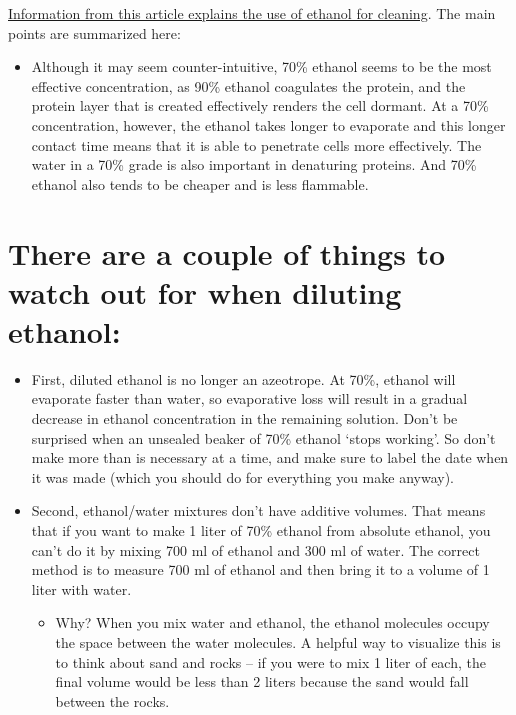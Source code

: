 \documentclass[
  letterpaper,
  DIV=11,
  numbers=noendperiod]{scrreprt}
\providecommand{\tightlist}{%
  \setlength{\itemsep}{0pt}\setlength{\parskip}{0pt}}\usepackage{longtable,booktabs,array}
\begin{document}
\href{https://bitesizebio.com/13518/which-type-of-ethanol-should-i-use/}{Information
from this article explains the use of ethanol for cleaning}. The main
points are summarized here:

\begin{itemize}
\tightlist
\item
  Although it may seem counter-intuitive, 70\% ethanol seems to be the
  most effective concentration, as 90\% ethanol coagulates the protein,
  and the protein layer that is created effectively renders the cell
  dormant. At a 70\% concentration, however, the ethanol takes longer to
  evaporate and this longer contact time means that it is able to
  penetrate cells more effectively. The water in a 70\% grade is also
  important in denaturing proteins. And 70\% ethanol also tends to be
  cheaper and is less flammable.
\end{itemize}

\hypertarget{there-are-a-couple-of-things-to-watch-out-for-when-diluting-ethanol}{%
\section*{\texorpdfstring{\textbf{There are a couple of things to watch
out for when diluting
ethanol:}}{There are a couple of things to watch out for when diluting ethanol:}}\label{there-are-a-couple-of-things-to-watch-out-for-when-diluting-ethanol}}

\begin{itemize}
\item
  First, diluted ethanol is no longer an azeotrope. At 70\%, ethanol
  will evaporate faster than water, so evaporative loss will result in a
  gradual decrease in ethanol concentration in the remaining solution.
  Don't be surprised when an unsealed beaker of 70\% ethanol `stops
  working'. So don't make more than is necessary at a time, and make
  sure to label the date when it was made (which you should do for
  everything you make anyway).
\item
  Second, ethanol/water mixtures don't have additive volumes. That means
  that if you want to make 1 liter of 70\% ethanol from absolute
  ethanol, you can't do it by mixing 700 ml of ethanol and 300 ml of
  water. The correct method is to measure 700 ml of ethanol and then
  bring it to a volume of 1 liter with water.

  \begin{itemize}
  \tightlist
  \item
    Why? When you mix water and ethanol, the ethanol molecules occupy
    the space between the water molecules. A helpful way to visualize
    this is to think about sand and rocks -- if you were to mix 1 liter
    of each, the final volume would be less than 2 liters because the
    sand would fall between the rocks.
  \end{itemize}
\end{itemize}
\end{document}

